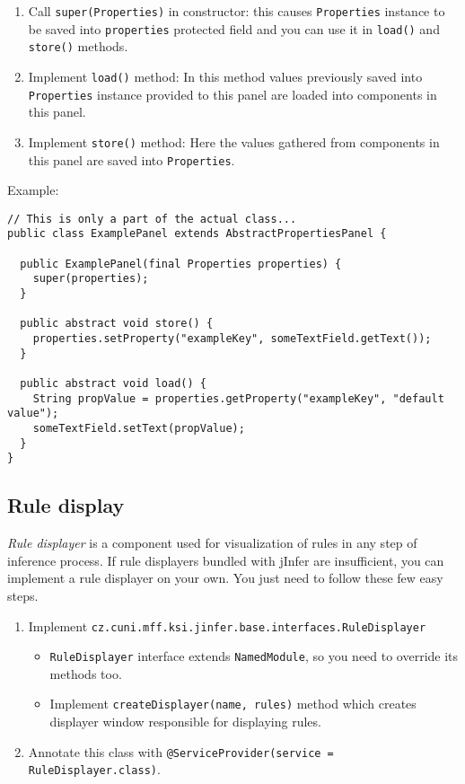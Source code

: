\documentclass[a4paper,10pt,oneside]{article}
\begin{document}
\begin{enumerate}
  \item 
    Call \texttt{super(Properties)} in constructor: this causes
    \texttt{Properties} instance to be saved into
    \texttt{properties} protected field and you can use it in
    \texttt{load()} and \texttt{store()} methods.
  
  \item 
    Implement \texttt{load()} method: In this method values previously saved
    into \texttt{Properties} instance provided to this panel are loaded into
    components in this panel.
  
  \item 
    Implement \texttt{store()} method: Here the values gathered from
    components in this panel are saved into \texttt{Properties}.
  
\end{enumerate}
\noindent Example:
\begin{verbatim}
// This is only a part of the actual class...
public class ExamplePanel extends AbstractPropertiesPanel {

  public ExamplePanel(final Properties properties) {
    super(properties);
  }

  public abstract void store() {
    properties.setProperty("exampleKey", someTextField.getText());
  }

  public abstract void load() {
    String propValue = properties.getProperty("exampleKey", "default value");
    someTextField.setText(propValue);
  }
}
\end{verbatim}
\newpage

\subsection*{Rule display}
  \textit{Rule displayer} is a component used for visualization of rules in any
  step of inference process. If rule displayers bundled with jInfer are
  insufficient, you can implement a rule displayer on your own.
  You just need to follow these few easy steps.

\begin{enumerate}
  \item 
    Implement \texttt{cz.cuni.mff.ksi.jinfer.base.interfaces.RuleDisplayer}
    \begin{itemize}
      \item 
        \texttt{RuleDisplayer} interface extends \texttt{NamedModule},
        so you need to override its methods too.
      
      \item 
        Implement \texttt{createDisplayer(name, rules)} method which creates
        displayer window responsible for displaying rules.
      
    \end{itemize}
  
  \item 
    Annotate this class with
    \texttt{@ServiceProvider(service = RuleDisplayer.class)}.
  
\end{enumerate}
\end{document}
